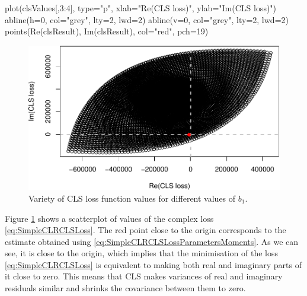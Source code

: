 \documentclass[
]{book}
\newenvironment{Shaded}{\begin{snugshade}}{\end{snugshade}}
\newcommand{\AttributeTok}[1]{\textcolor[rgb]{0.77,0.63,0.00}{#1}}
\newcommand{\DecValTok}[1]{\textcolor[rgb]{0.00,0.00,0.81}{#1}}
\newcommand{\FunctionTok}[1]{\textcolor[rgb]{0.00,0.00,0.00}{#1}}
\newcommand{\NormalTok}[1]{#1}
\newcommand{\SpecialCharTok}[1]{\textcolor[rgb]{0.00,0.00,0.00}{#1}}
\newcommand{\StringTok}[1]{\textcolor[rgb]{0.31,0.60,0.02}{#1}}
\begin{document}
\begin{Shaded}
\begin{Highlighting}[]
\FunctionTok{plot}\NormalTok{(clsValues[,}\DecValTok{3}\SpecialCharTok{:}\DecValTok{4}\NormalTok{], }\AttributeTok{type=}\StringTok{"p"}\NormalTok{,}
     \AttributeTok{xlab=}\StringTok{"Re(CLS loss)"}\NormalTok{, }\AttributeTok{ylab=}\StringTok{"Im(CLS loss)"}\NormalTok{)}
\FunctionTok{abline}\NormalTok{(}\AttributeTok{h=}\DecValTok{0}\NormalTok{, }\AttributeTok{col=}\StringTok{"grey"}\NormalTok{, }\AttributeTok{lty=}\DecValTok{2}\NormalTok{, }\AttributeTok{lwd=}\DecValTok{2}\NormalTok{)}
\FunctionTok{abline}\NormalTok{(}\AttributeTok{v=}\DecValTok{0}\NormalTok{, }\AttributeTok{col=}\StringTok{"grey"}\NormalTok{, }\AttributeTok{lty=}\DecValTok{2}\NormalTok{, }\AttributeTok{lwd=}\DecValTok{2}\NormalTok{)}
\FunctionTok{points}\NormalTok{(}\FunctionTok{Re}\NormalTok{(clsResult), }\FunctionTok{Im}\NormalTok{(clsResult), }\AttributeTok{col=}\StringTok{"red"}\NormalTok{, }\AttributeTok{pch=}\DecValTok{19}\NormalTok{)}
\end{Highlighting}
\end{Shaded}

\begin{figure}
\centering
\includegraphics{Svetunkov---Svetunkov---Complex-Dynamic-Models_files/figure-latex/clsScatter-1.pdf}
\caption{\label{fig:clsScatter}Variety of CLS loss function values for different values of \(b_1\).}
\end{figure}

Figure \ref{fig:clsScatter} shows a scatterplot of values of the complex loss \eqref{eq:SimpleCLRCLSLoss}. The red point close to the origin corresponds to the estimate obtained using \eqref{eq:SimpleCLRCLSLossParametersMoments}. As we can see, it is close to the origin, which implies that the minimisation of the loss \eqref{eq:SimpleCLRCLSLoss} is equivalent to making both real and imaginary parts of it close to zero. This means that CLS makes variances of real and imaginary residuals similar and shrinks the covariance between them to zero.
\end{document}
